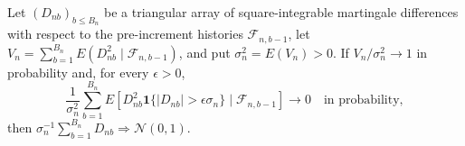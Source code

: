 Let \((D_{nb})_{b\le B_n}\) be a triangular array of square-integrable martingale differences with respect to the pre-increment histories \(\mathcal F_{n,b-1}\), let \(V_n=\sum_{b=1}^{B_n}E(D_{nb}^2\mid\mathcal F_{n,b-1})\), and put \(\sigma_n^2=E(V_n)>0\).  If \(V_n/\sigma_n^2\to1\) in probability and, for every \(\epsilon>0\),
\[
\frac1{\sigma_n^2}\sum_{b=1}^{B_n}E\left[D_{nb}^2\mathbf 1\{|D_{nb}|>\epsilon\sigma_n\}\mid\mathcal F_{n,b-1}\right]\to0
\quad\text{in probability},
\]
then \(\sigma_n^{-1}\sum_{b=1}^{B_n}D_{nb}\Rightarrow\mathcal N(0,1)\).